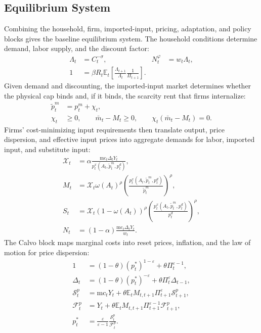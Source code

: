 ﻿\documentclass[12pt]{article}
\theoremstyle{remark}
\newcommand{\E}{\mathbb E}
\newcommand{\mc}{\mathrm{mc}}
\begin{document}
\subsection{Equilibrium System}

Combining the household, firm, imported-input, pricing, adaptation, and policy blocks gives the
baseline equilibrium system. The household conditions determine demand, labor supply, and the
discount factor:
\begin{align}
    \Lambda_t&=C_t^{-\sigma},
    &
    N_t^\varphi&=w_t\Lambda_t,
    \label{eq:system_household_static}\\
    1&=\beta R_t\E_t\left[
        \frac{\Lambda_{t+1}}{\Lambda_t}\frac{1}{\Pi_{t+1}}
    \right].
    \label{eq:system_household_euler}
\end{align}
Given demand and discounting, the imported-input market determines whether the physical cap binds
and, if it binds, the scarcity rent that firms internalize:
\begin{align}
    \tilde p_t^m&=p_t^m+\chi_t,
    \label{eq:system_effective_price}\\
    \chi_t&\ge0,
    \qquad
    \bar m_t-M_t\ge0,
    \qquad
    \chi_t(\bar m_t-M_t)=0.
    \label{eq:system_input_market}
\end{align}
Firms' cost-minimizing input requirements then translate output, price dispersion, and effective
input prices into aggregate demands for labor, imported input, and substitute input:
\begin{align}
    \mathcal X_t
    &=
    \alpha\frac{\mc_t\Delta_tY_t}{p_t^x(A_t,\tilde p_t^m,p_t^d)},
    \label{eq:system_x}\\
    M_t
    &=
    \mathcal X_t\omega(A_t)^\rho
    \left(\frac{p_t^x(A_t,\tilde p_t^m,p_t^d)}{\tilde p_t^m}\right)^\rho,
    \label{eq:system_M}\\
    S_t
    &=
    \mathcal X_t(1-\omega(A_t))^\rho
    \left(\frac{p_t^x(A_t,\tilde p_t^m,p_t^d)}{p_t^d}\right)^\rho,
    \label{eq:system_S}\\
    N_t
    &=
    (1-\alpha)\frac{\mc_t\Delta_tY_t}{w_t}.
    \label{eq:system_labor}
\end{align}
The Calvo block maps marginal costs into reset prices, inflation, and the law of motion for price
dispersion:
\begin{align}
    1
    &=
    (1-\theta)(p_t^*)^{1-\varepsilon}
    +
    \theta\Pi_t^{\varepsilon-1},
    \label{eq:system_calvo_price_index}\\
    \Delta_t
    &=
    (1-\theta)(p_t^*)^{-\varepsilon}
    +
    \theta\Pi_t^\varepsilon\Delta_{t-1},
    \label{eq:system_calvo_dispersion}\\
    \mathcal S_t^p
    &=
    \mc_tY_t
    +
    \theta\E_tM_{t,t+1}\Pi_{t+1}^{\varepsilon}\mathcal S_{t+1}^p,
    \label{eq:system_calvo_S}\\
    \mathcal F_t^p
    &=
    Y_t
    +
    \theta\E_tM_{t,t+1}\Pi_{t+1}^{\varepsilon-1}\mathcal F_{t+1}^p,
    \label{eq:system_calvo_F}\\
    p_t^*
    &=
    \frac{\varepsilon}{\varepsilon-1}
    \frac{\mathcal S_t^p}{\mathcal F_t^p}.
    \label{eq:system_reset_price}
\end{align}
\end{document}
